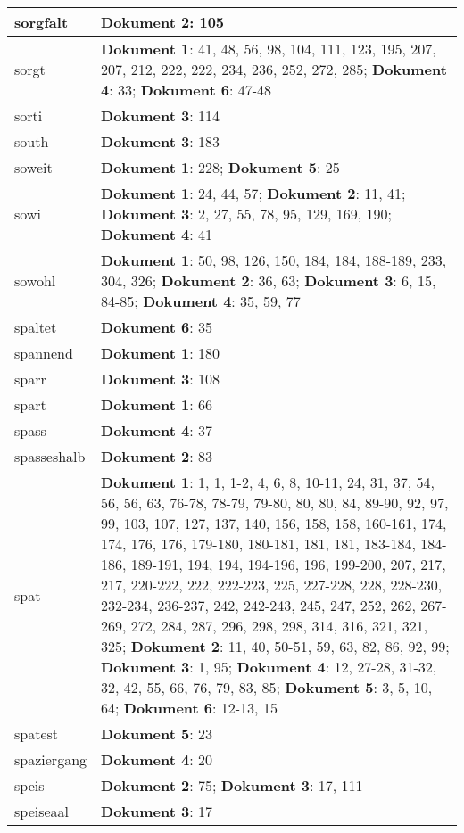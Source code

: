 \documentclass[a5paper]{article}
\begin{document}
\begin{longtable}[l]{|l|p{3in}|}
\hline
sorgfalt & \textbf{Dokument 2}: 105 \\
\hline
sorgt & \textbf{Dokument 1}: 41, 48, 56, 98, 104, 111, 123, 195, 207, 207, 212, 222, 222, 234, 236, 252, 272, 285; \textbf{Dokument 4}: 33; \textbf{Dokument 6}: 47-48 \\
\hline
sorti & \textbf{Dokument 3}: 114 \\
\hline
south & \textbf{Dokument 3}: 183 \\
\hline
soweit & \textbf{Dokument 1}: 228; \textbf{Dokument 5}: 25 \\
\hline
sowi & \textbf{Dokument 1}: 24, 44, 57; \textbf{Dokument 2}: 11, 41; \textbf{Dokument 3}: 2, 27, 55, 78, 95, 129, 169, 190; \textbf{Dokument 4}: 41 \\
\hline
sowohl & \textbf{Dokument 1}: 50, 98, 126, 150, 184, 184, 188-189, 233, 304, 326; \textbf{Dokument 2}: 36, 63; \textbf{Dokument 3}: 6, 15, 84-85; \textbf{Dokument 4}: 35, 59, 77 \\
\hline
spaltet & \textbf{Dokument 6}: 35 \\
\hline
spannend & \textbf{Dokument 1}: 180 \\
\hline
sparr & \textbf{Dokument 3}: 108 \\
\hline
spart & \textbf{Dokument 1}: 66 \\
\hline
spass & \textbf{Dokument 4}: 37 \\
\hline
spasseshalb & \textbf{Dokument 2}: 83 \\
\hline
spat & \textbf{Dokument 1}: 1, 1, 1-2, 4, 6, 8, 10-11, 24, 31, 37, 54, 56, 56, 63, 76-78, 78-79, 79-80, 80, 80, 84, 89-90, 92, 97, 99, 103, 107, 127, 137, 140, 156, 158, 158, 160-161, 174, 174, 176, 176, 179-180, 180-181, 181, 181, 183-184, 184-186, 189-191, 194, 194, 194-196, 196, 199-200, 207, 217, 217, 220-222, 222, 222-223, 225, 227-228, 228, 228-230, 232-234, 236-237, 242, 242-243, 245, 247, 252, 262, 267-269, 272, 284, 287, 296, 298, 298, 314, 316, 321, 321, 325; \textbf{Dokument 2}: 11, 40, 50-51, 59, 63, 82, 86, 92, 99; \textbf{Dokument 3}: 1, 95; \textbf{Dokument 4}: 12, 27-28, 31-32, 32, 42, 55, 66, 76, 79, 83, 85; \textbf{Dokument 5}: 3, 5, 10, 64; \textbf{Dokument 6}: 12-13, 15 \\
\hline
spatest & \textbf{Dokument 5}: 23 \\
\hline
spaziergang & \textbf{Dokument 4}: 20 \\
\hline
speis & \textbf{Dokument 2}: 75; \textbf{Dokument 3}: 17, 111 \\
\hline
speiseaal & \textbf{Dokument 3}: 17 \\

\end{longtable}
\end{document}
